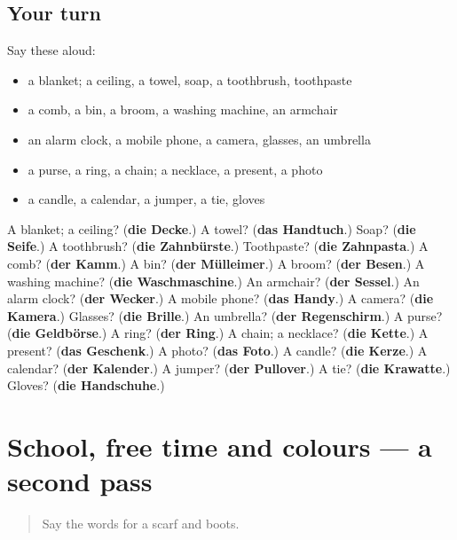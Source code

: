\subsection*{Your turn}
Say these aloud:

\begin{itemize}
\raggedright
  \item a blanket; a ceiling, a towel, soap, a toothbrush, toothpaste
  \item a comb, a bin, a broom, a washing machine, an armchair
  \item an alarm clock, a mobile phone, a camera, glasses, an umbrella
  \item a purse, a ring, a chain; a necklace, a present, a photo
  \item a candle, a calendar, a jumper, a tie, gloves
\end{itemize}

\begin{tcolorbox}[breakable,colback=teal!4,colframe=teal!35!black,title={Before you move on}]
A blanket; a ceiling? (\textbf{die Decke}.) A towel? (\textbf{das Handtuch}.) Soap? (\textbf{die Seife}.) A toothbrush? (\textbf{die Zahnbürste}.) Toothpaste? (\textbf{die Zahnpasta}.) A comb? (\textbf{der Kamm}.) A bin? (\textbf{der Mülleimer}.) A broom? (\textbf{der Besen}.) A washing machine? (\textbf{die Waschmaschine}.) An armchair? (\textbf{der Sessel}.) An alarm clock? (\textbf{der Wecker}.) A mobile phone? (\textbf{das Handy}.) A camera? (\textbf{die Kamera}.) Glasses? (\textbf{die Brille}.) An umbrella? (\textbf{der Regenschirm}.) A purse? (\textbf{die Geldbörse}.) A ring? (\textbf{der Ring}.) A chain; a necklace? (\textbf{die Kette}.) A present? (\textbf{das Geschenk}.) A photo? (\textbf{das Foto}.) A candle? (\textbf{die Kerze}.) A calendar? (\textbf{der Kalender}.) A jumper? (\textbf{der Pullover}.) A tie? (\textbf{die Krawatte}.) Gloves? (\textbf{die Handschuhe}.)
\end{tcolorbox}
\section[(dialogue)]{School, free time and colours — a second pass}

\label{lesson:GE-R123-second-pass-school-free-time-and-colours}



\begin{quote}
Say the words for a scarf and boots.
\end{quote}

